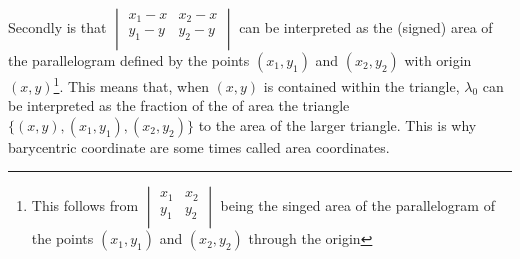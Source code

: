 Secondly is that $\begin{vmatrix}x_1-x&x_2-x\\y_1-y&y_2-y\\\end{vmatrix}$ can be interpreted as the (signed) area of the parallelogram defined by the points $(x_1,y_1)$ and $(x_2,y_2)$ with origin $(x,y)$\footnote{This follows from $\begin{vmatrix}x_1&x_2\\y_1&y_2\\\end{vmatrix}$ being the singed area of the parallelogram of the points $(x_1,y_1)$ and $(x_2,y_2)$ through the origin}.
This means that, 
when $(x,y)$ is contained within the triangle,
$\lambda_0$ can be interpreted as the fraction of the of area the triangle $\{(x,y),(x_1,y_1),(x_2,y_2)\}$ to the area of the larger triangle.
This is why barycentric coordinate are some times called area coordinates. 

